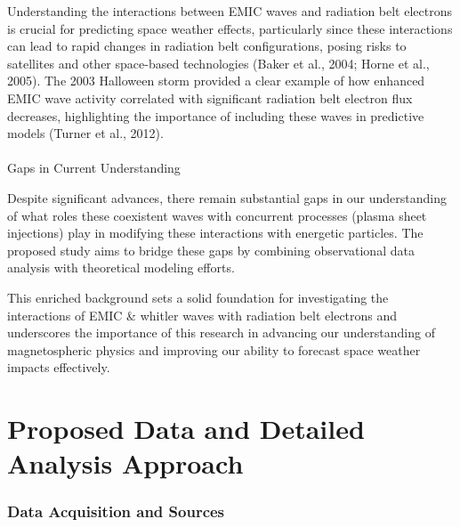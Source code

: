 \documentclass[
  letterpaper,
  DIV=11,
  numbers=noendperiod]{scrartcl}
\makeatletter
\let\oldparagraph\paragraph
\renewcommand{\paragraph}{
    \@ifstar
      \xxxParagraphStar
      \xxxParagraphNoStar
  }
\newcommand{\xxxParagraphStar}[1]{\oldparagraph*{#1}\mbox{}}
\newcommand{\xxxParagraphNoStar}[1]{\oldparagraph{#1}\mbox{}}
\makeatother
\begin{document}
Understanding the interactions between EMIC waves and radiation belt electrons is crucial for predicting space weather effects, particularly since these interactions can lead to rapid changes in radiation belt configurations, posing risks to satellites and other space-based technologies (Baker et al., 2004; Horne et al., 2005). The 2003 Halloween storm provided a clear example of how enhanced EMIC wave activity correlated with significant radiation belt electron flux decreases, highlighting the importance of including these waves in predictive models (Turner et al., 2012).

\paragraph{Gaps in Current Understanding}\label{gaps-in-current-understanding}

Despite significant advances, there remain substantial gaps in our understanding of what roles these coexistent waves with concurrent processes (plasma sheet injections) play in modifying these interactions with energetic particles. The proposed study aims to bridge these gaps by combining observational data analysis with theoretical modeling efforts.

This enriched background sets a solid foundation for investigating the interactions of EMIC \& whitler waves with radiation belt electrons and underscores the importance of this research in advancing our understanding of magnetospheric physics and improving our ability to forecast space weather impacts effectively.

\section{Proposed Data and Detailed Analysis Approach}\label{proposed-data-and-detailed-analysis-approach}

\subsubsection{Data Acquisition and Sources}\label{data-acquisition-and-sources}
\end{document}
